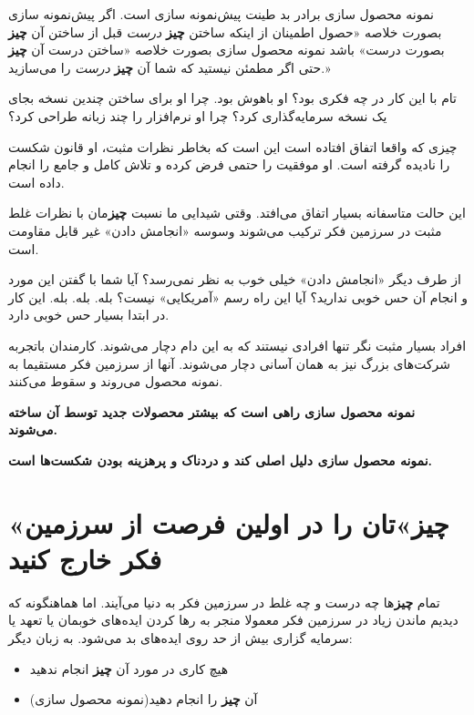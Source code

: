 نمونه محصول سازی برادر بد طینت پیش‌نمونه سازی است. اگر پیش‌نمونه سازی
بصورت خلاصه «حصول اطمینان از اینکه ساختن \textbf{چیز} \emph{درست} قبل از
ساختن آن \textbf{چیز} بصورت درست» باشد نمونه محصول سازی بصورت خلاصه
«ساختن درست آن \textbf{چیز} حتی اگر مطمئن نیستید که شما آن \textbf{چیز}
\emph{درست} را می‌سازید.»

تام با این کار در چه فکری بود؟ او باهوش بود. چرا او برای ساختن چندین
نسخه بجای یک نسخه سرمایه‌گذاری کرد؟ چرا او نرم‌افزار را چند زبانه طراحی
کرد؟

چیزی که واقعا اتفاق افتاده است این است که بخاطر نظرات مثبت، او قانون
شکست را نادیده گرفته است. او موفقیت را حتمی فرض کرده و تلاش کامل و جامع
را انجام داده است.

این حالت متاسفانه بسیار اتفاق می‌افتد. وقتی شیدایی ما نسبت
\textbf{چیز}مان با نظرات غلط مثبت در سرزمین فکر ترکیب می‌شوند وسوسه
«انجامش دادن» غیر قابل مقاومت است.

از طرف دیگر «انجامش دادن» خیلی خوب به نظر نمی‌رسد؟ آیا شما با گفتن این
مورد و انجام آن حس خوبی ندارید؟ آیا این راه رسم «آمریکایی» نیست؟ بله.
بله. بله. این کار در ابتدا بسیار حس خوبی دارد.

افراد بسیار مثبت نگر تنها افرادی نیستند که به این دام دچار می‌شوند.
کارمندان باتجربه شرکت‌های بزرگ نیز به همان آسانی دچار می‌شوند. آنها از
سرزمین فکر مستقیما به نمونه محصول می‌روند و سقوط می‌کنند.

\textbf{نمونه محصول سازی راهی است که بیشتر محصولات جدید توسط آن ساخته
می‌شوند.}

\textbf{نمونه محصول سازی دلیل اصلی کند و دردناک و پرهزینه بودن شکست‌ها
است.}

\section{«چیز»تان را در اولین فرصت از سرزمین فکر خارج
کنید}\label{ux686ux6ccux632ux62aux627ux646-ux631ux627-ux62fux631-ux627ux648ux644ux6ccux646-ux641ux631ux635ux62a-ux627ux632-ux633ux631ux632ux645ux6ccux646-ux641ux6a9ux631-ux62eux627ux631ux62c-ux6a9ux646ux6ccux62f}

تمام \textbf{چیز}ها چه درست و چه غلط در سرزمین فکر به دنیا می‌آیند. اما
هماهنگونه که دیدیم ماندن زیاد در سرزمین فکر معمولا منجر به رها کردن
ایده‌های خوبمان یا تعهد یا سرمایه گزاری بیش از حد روی ایده‌های بد
می‌شود. به زبان دیگر:

\begin{itemize}

\item
  هیچ کاری در مورد آن \textbf{چیز} انجام ندهید
\item
  آن \textbf{چیز} را انجام دهید(نمونه محصول سازی)
\end{itemize}

